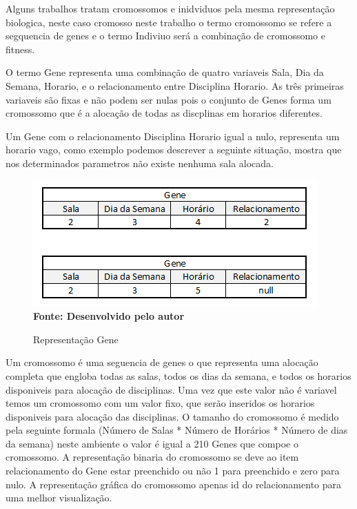\documentclass{abntpuc}
\begin{document}

Alguns trabalhos tratam cromossomos e inidviduos pela mesma representação biologica, neste caso cromosso neste trabalho o termo cromossomo se refere a segquencia de genes e o termo Indiviuo será a combinação de cromossomo e fitness.\par

O termo Gene representa uma combinação de quatro variaveis Sala, Dia da Semana, Horario, e o relacionamento entre Disciplina Horario. As três primeiras variaveis são fixas e não podem ser nulas pois o conjunto de Genes forma um cromossomo que é a alocação de todas as discplinas em horarios diferentes.\par

Um Gene com o relacionamento Disciplina Horario igual a nulo, representa um horario vago, como exemplo podemos descrever a seguinte situação, mostra que nos determinados parametros não existe nenhuma sala alocada.\par

\begin{figure}[!htb]
\caption[Representação Gene]{Representação Gene}
\label{fig:figura5}
\centering
\includegraphics[scale=0.7]{imagens/representacaoGene.png}
\\ \textbf{\footnotesize Fonte: Desenvolvido pelo autor}
\end{figure}

Um cromossomo é uma seguencia de genes o que representa uma alocação completa que engloba todas as salas, todos os dias da semana, e todos os horarios disponiveis para alocação de disciplinas. Uma vez que este valor não é variavel temos um cromossomo com um valor fixo, que serão inseridos os horarios disponiveis para alocação das disciplinas. O tamanho do cromossomo é medido pela seguinte formala (Número de Salas * Número de Horários * Número de dias da semana) neste ambiente o valor é igual a 210 Genes que compoe o cromossomo. A representação binaria do cromossomo se deve ao item relacionamento do Gene estar preenchido ou não 1 para preenchido e zero para nulo. A representação gráfica do cromossomo apenas id do relacionamento para uma melhor visualização.\par
\end{document}

